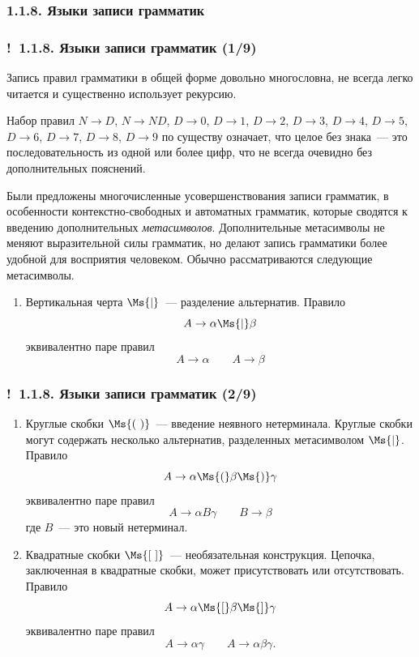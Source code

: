 \documentclass[mathserif,12pt,aspectratio=169]{beamer}
\renewcommand{\index}[1]{}
\def\odmkey#1#2{{\it\color{red} #1}\index{#2}}
\def\Ok{{\color{green}\textbf{!}\ }}
\begin{document}
\subsubsection{1.1.8. Языки записи грамматик}\label{1.1.8.}
\begin{frame}
\frametitle{\Ok 1.1.8. Языки записи грамматик (1/9)}
Запись правил грамматики в общей форме довольно многословна, не всегда легко читается и
существенно использует рекурсию. 

\begin{example}
Набор правил
$N\to D$, $N\to ND$, $D\to 0$,
$D\to 1$, $D\to 2$, $D\to 3$, 
$D\to 4$, $D\to 5$, 
$D\to 6$, $D\to 7$, $D\to 8$, $D\to 9$
по существу означает, что целое без знака~--- это
последовательность из одной или более цифр, что не всегда очевидно
без дополнительных пояснений.
\end{example}

\smallskip
Были предложены многочисленные усовершенствования записи грамматик, в особенности контекстно-свободных и 
автоматных грамматик,
которые сводятся к введению дополнительных
\odmkey{метасимволов}{Метасимвол}. Дополнительные метасимволы не
меняют выразительной силы  грамматик, но делают запись грамматики более
удобной для восприятия человеком. Обычно рассматриваются следующие
метасимволы.

\begin{enumerate}
\item Вертикальная черта $\Ms{|}$~--- разделение альтернатив. Правило
$$
A\rightarrow \alpha \Ms{|}\beta
$$
эквивалентно паре правил
$$
A\rightarrow \alpha  \qquad A\rightarrow\beta
$$
\end{enumerate}
\end{frame}

\begin{frame}
\frametitle{\Ok 1.1.8. Языки записи грамматик (2/9)}
\begin{enumerate}

\item[2.] Круглые скобки $\Ms{(\ )}$~--- введение неявного нетерминала.
Круглые скобки могут содержать несколько альтернатив, разделенных
метасимволом $\Ms{|}$. Правило
$$
A\rightarrow \alpha\Ms{(}\beta\Ms{)}\gamma
$$
эквивалентно паре правил
$$
A\rightarrow \alpha B\gamma \qquad B\rightarrow\beta
$$
где $B$~--- это новый нетерминал.
\item[3.] Квадратные скобки $\Ms{[\ ]}$~--- необязательная конструкция.
Цепочка, заключенная в квадратные скобки, может присутствовать или
отсутствовать. Правило
$$
A\rightarrow \alpha\Ms{[}\beta\Ms{]}\gamma
$$
эквивалентно паре правил
$$
A\rightarrow \alpha\gamma \qquad A\rightarrow\alpha\beta\gamma.
$$
\end{enumerate}
\end{frame}
\end{document}

